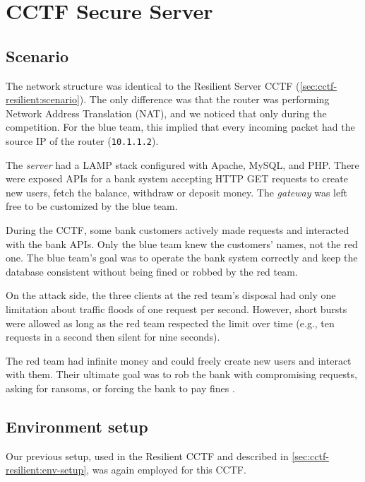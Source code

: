 \section{CCTF Secure Server}
\label{sec:cctf-secure}

\subsection{Scenario}
\label{sec:cctf-secure:scenario}

The network structure was identical to the Resilient Server CCTF (\autoref{sec:cctf-resilient:scenario}). The only difference was that the router was performing Network Address Translation (NAT), and we noticed that only during the competition. 
For the blue team, this implied that every incoming packet had the source IP of the router (\texttt{10.1.1.2}).

The \textit{server} had a LAMP stack configured with Apache, MySQL, and PHP.  
There were exposed APIs for a bank system accepting HTTP GET requests to create new users, fetch the balance, withdraw or deposit money.
The \textit{gateway} was left free to be customized by the blue team. 

During the CCTF, some bank customers actively made requests and interacted with the bank APIs. Only the blue team knew the customers' names, not the red one. The blue team's goal was to operate the bank system correctly and keep the database consistent without being fined or robbed by the red team.

On the attack side, the three clients at the red team's disposal had only one limitation about traffic floods of one request per second. However, short bursts were allowed as long as the red team respected the limit over time (e.g., ten requests in a second then silent for nine seconds). 

The red team had infinite money and could freely create new users and interact with them. Their ultimate goal was to rob the bank with compromising requests, asking for ransoms, or forcing the bank to pay fines \cite{secure-server}.

\subsection{Environment setup}
\label{sec:cctf-secure:env-setup}

Our previous setup, used in the Resilient CCTF and described in  \autoref{sec:cctf-resilient:env-setup}, was again employed for this CCTF.

